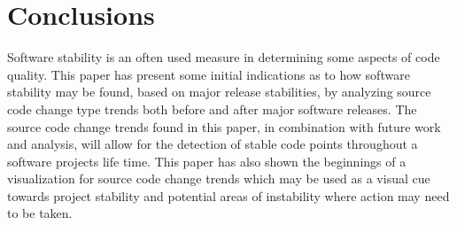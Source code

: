 \documentclass[conference]{IEEEtran}
\begin{document}
\section{Conclusions}

Software stability is an often used measure in determining some aspects of code quality. This paper has present some initial indications as to how
software stability may be found, based on major release stabilities, by analyzing source code change type trends both before and after major software
releases. The source code change trends found in this paper, in combination with future work and analysis, will allow for the detection of stable code
points throughout a software projects life time. This paper has also shown the beginnings of a visualization for source code change trends which may
be used as a visual cue towards project stability and potential areas of instability where action may need to be taken.




\end{document}

